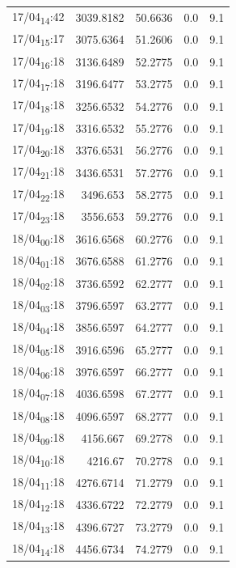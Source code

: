 \documentclass[11pt]{article}
\begin{document}
\begin{center}
\begin{tabular}{lrrrr}
17/04\textsubscript{14}:42 & 3039.8182 & 50.6636 & 0.0 & 9.1\\[0pt]
17/04\textsubscript{15}:17 & 3075.6364 & 51.2606 & 0.0 & 9.1\\[0pt]
17/04\textsubscript{16}:18 & 3136.6489 & 52.2775 & 0.0 & 9.1\\[0pt]
17/04\textsubscript{17}:18 & 3196.6477 & 53.2775 & 0.0 & 9.1\\[0pt]
17/04\textsubscript{18}:18 & 3256.6532 & 54.2776 & 0.0 & 9.1\\[0pt]
17/04\textsubscript{19}:18 & 3316.6532 & 55.2776 & 0.0 & 9.1\\[0pt]
17/04\textsubscript{20}:18 & 3376.6531 & 56.2776 & 0.0 & 9.1\\[0pt]
17/04\textsubscript{21}:18 & 3436.6531 & 57.2776 & 0.0 & 9.1\\[0pt]
17/04\textsubscript{22}:18 & 3496.653 & 58.2775 & 0.0 & 9.1\\[0pt]
17/04\textsubscript{23}:18 & 3556.653 & 59.2776 & 0.0 & 9.1\\[0pt]
18/04\textsubscript{00}:18 & 3616.6568 & 60.2776 & 0.0 & 9.1\\[0pt]
18/04\textsubscript{01}:18 & 3676.6588 & 61.2776 & 0.0 & 9.1\\[0pt]
18/04\textsubscript{02}:18 & 3736.6592 & 62.2777 & 0.0 & 9.1\\[0pt]
18/04\textsubscript{03}:18 & 3796.6597 & 63.2777 & 0.0 & 9.1\\[0pt]
18/04\textsubscript{04}:18 & 3856.6597 & 64.2777 & 0.0 & 9.1\\[0pt]
18/04\textsubscript{05}:18 & 3916.6596 & 65.2777 & 0.0 & 9.1\\[0pt]
18/04\textsubscript{06}:18 & 3976.6597 & 66.2777 & 0.0 & 9.1\\[0pt]
18/04\textsubscript{07}:18 & 4036.6598 & 67.2777 & 0.0 & 9.1\\[0pt]
18/04\textsubscript{08}:18 & 4096.6597 & 68.2777 & 0.0 & 9.1\\[0pt]
18/04\textsubscript{09}:18 & 4156.667 & 69.2778 & 0.0 & 9.1\\[0pt]
18/04\textsubscript{10}:18 & 4216.67 & 70.2778 & 0.0 & 9.1\\[0pt]
18/04\textsubscript{11}:18 & 4276.6714 & 71.2779 & 0.0 & 9.1\\[0pt]
18/04\textsubscript{12}:18 & 4336.6722 & 72.2779 & 0.0 & 9.1\\[0pt]
18/04\textsubscript{13}:18 & 4396.6727 & 73.2779 & 0.0 & 9.1\\[0pt]
18/04\textsubscript{14}:18 & 4456.6734 & 74.2779 & 0.0 & 9.1\\[0pt]

\end{tabular}
\end{center}
\end{document}
